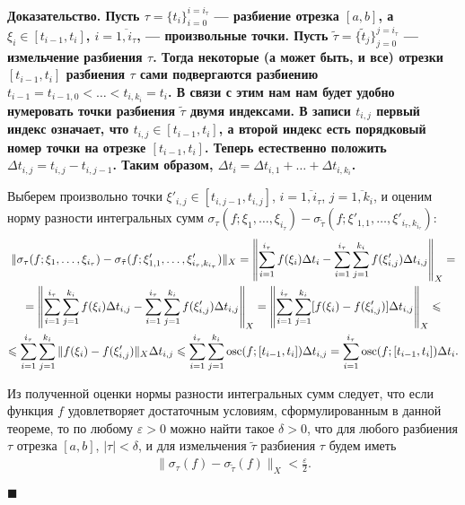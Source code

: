 \documentclass{report}
\newenvironment{Proof}{\par\noindent\bf Доказательство.\rm}{ $\blacksquare$\par}
\newcommand{\osc}{\mathop{\rm osc}\nolimits}
\begin{document}
\begin{Proof}
Пусть $\tau=\{t_i\}_{i=0}^{i=i_\tau}$ --- разбиение отрезка $[a,b]$, а $\xi_i\in[t_{i-1},t_i]$, $i=\overline{1,i_\tau}$, --- произвольные точки. Пусть $\tilde{\tau}=
\{\tilde{t}_j\}_{j=0}^{j=i_\tau}$ --- измельчение разбиения $\tau$. Тогда некоторые (а может быть, и все) отрезки $[t_{i-1},t_i]$ разбиения $\tau$ сами подвергаются разбиению
$t_{i-1}=t_{i-1,0}<\dots<t_{i,k_i}=t_i$. В связи с этим нам нам будет удобно нумеровать точки разбиения $\tilde{\tau}$ двумя индексами. В записи $t_{i,j}$ первый индекс означает, что
$t_{i,j}\in[t_{i-1},t_i]$, а второй индекс есть порядковый номер точки на отрезке $[t_{i-1},t_i]$. Теперь естественно положить $\Delta t_{i,j}=t_{i,j}-t_{i,j-1}$.
Таким образом, $\Delta t_i=\Delta t_{i,1}+\dots+\Delta t_{i,k_i}$.

Выберем произвольно точки $\xi'_{i,j}\in[t_{i,j-1},t_{i,j}]$, $i=\overline{1,i_\tau}$, $j=\overline{1,k_i}$, и оценим норму разности
интегральных сумм $\sigma_\tau(f;\xi_1,\dots,\xi_{i_\tau})-\sigma_{\tilde{\tau}}(f;\xi'_{1,1},\dots,\xi'_{i_\tau,k_{i_\tau}})$:
\begin{gather*}
\|\sigma_\tau(f;\xi_1,\dots,\xi_{i_\tau})-\sigma_{\tilde{\tau}}(f;\xi'_{1,1},\dots,\xi'_{i_\tau,k_{i_\tau}})\|_X=
\left\|\sum\limits_{i=1}^{i_\tau}f(\xi_i)\Delta t_i-\sum\limits_{i=1}^{i_\tau}\sum\limits_{j=1}^{k_i}f(\xi'_{i,j})\Delta t_{i,j}\right\|_X=\\
=\left\|\sum\limits_{i=1}^{i_\tau}\sum\limits_{j=1}^{k_i}f(\xi_i)\Delta t_{i,j}-\sum\limits_{i=1}^{i_\tau}\sum\limits_{j=1}^{k_i}
f(\xi'_{i,j})\Delta t_{i,j}\right\|_X=\left\|\sum\limits_{i=1}^{i_\tau}\sum\limits_{j=1}^{k_i}[f(\xi_i)-f(\xi'_{i,j})]\Delta t_{i,j}\right\|_X\leqslant\\
\leqslant\sum\limits_{i=1}^{i_\tau}\sum\limits_{j=1}^{k_i}\|f(\xi_i)-f(\xi'_{i,j})\|_X\Delta t_{i,j}\leqslant\sum\limits_{i=1}^{i_\tau}
\sum\limits_{j=1}^{k_i}\osc(f;[t_{i-1},t_i])\Delta t_{i,j}=\sum\limits_{i=1}^{i_\tau}\osc(f;[t_{i-1},t_i])\Delta t_{i}.
\end{gather*}

Из полученной оценки нормы разности интегральных сумм следует, что если функция $f$ удовлетворяет достаточным условиям, сформулированным в данной теореме, то по любому $\varepsilon>0$ можно
найти такое $\delta>0$, что для любого разбиения $\tau$ отрезка $[a,b]$, $|\tau|<\delta$, и для измельчения $\tilde\tau$ разбиения $\tau$ будем иметь
\begin{gather*}
\|\sigma_\tau(f)-\sigma_{\tilde{\tau}}(f)\|_X<\frac\varepsilon2.
\end{gather*}


\end{Proof}
\end{document}

